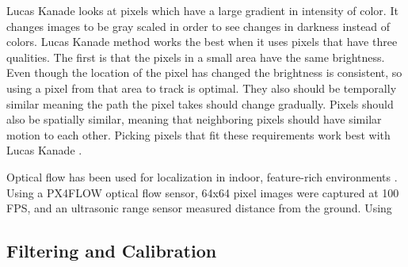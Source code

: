 \documentclass{article}
\begin{document}
    Lucas Kanade looks at pixels which have a large gradient in intensity of color. It changes images to be gray scaled in order to see changes in darkness instead of colors. Lucas Kanade method works the best when it uses pixels that have three qualities. The first is that the pixels in a small area have the same brightness. Even though the location of the pixel has changed the brightness is consistent, so using a pixel from that area to track is optimal. They also should be temporally similar meaning the path the pixel takes should change gradually. Pixels should also be spatially similar, meaning that neighboring pixels should have similar motion to each other. Picking pixels that fit these requirements work best with Lucas Kanade \cite{sun_optical_2008}.
    
    Optical flow has been used for localization in indoor, feature-rich environments \cite{gao_qingji_onboard_2015}. Using a PX4FLOW optical flow sensor, 64x64 pixel images were captured at 100 FPS, and an ultrasonic range sensor measured distance from the ground. Using 

  \subsection{Filtering and Calibration} \label{filtering}
\end{document}
